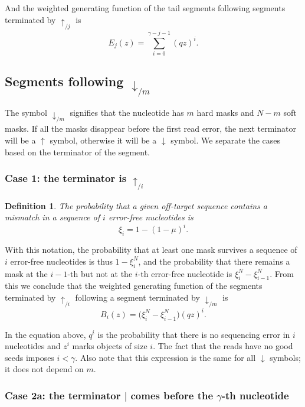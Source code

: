 \documentclass{article}
\newtheorem{definition}{Definition}
\begin{document}
And the weighted generating function of the tail segments following
segments terminated by $\uparrow_{/j}$ is
\begin{equation}
\label{eq:E}
E_j(z) = \sum_{i=0}^{\gamma-j-1} (qz)^i.
\end{equation}


\subsection{Segments following $\downarrow_{/m}$}

The symbol $\downarrow_{/m}$ signifies that the nucleotide has $m$ hard
masks and $N-m$ soft masks. If all the masks disappear before the first
read error, the next terminator will be a $\uparrow$ symbol, otherwise it
will be a $\downarrow$ symbol. We separate the cases based on the
terminator of the segment.

\subsubsection*{Case 1: the terminator is $\uparrow_{/i}$}

\begin{definition}
The probability that a given off-target sequence contains a mismatch in a
sequence of $i$ error-free nucleotides is
\begin{equation}
\label{eq:xi}
\xi_i = 1-(1-\mu)^i.
\end{equation}
\end{definition}

With this notation, the probability that at least one mask survives a
sequence of $i$ error-free nucleotides is thus $1-\xi_i^N$, and the
probability that there remains a mask at the $i-1$-th but not at the 
$i$-th error-free nucleotide is $\xi_i^N - \xi_{i-1}^N$. From this we
conclude that the weighted generating function of the segments terminated
by $\uparrow_{/i}$ following a segment terminated by $\downarrow_{/m}$ is
\begin{equation}
\label{eq:B}
B_i(z) = \Big( \xi_i^N-\xi_{i-1}^N \Big) (qz)^i.
\end{equation}

In the equation above, $q^i$ is the probability that there is no
sequencing error in $i$ nucleotides and $z^i$ marks objects of size $i$.
The fact that the reads have no good seeds imposes $i < \gamma$. Also note
that this expression is the same for all $\downarrow$ symbols; it does not
depend on $m$.

\subsubsection*{Case 2a: the terminator $|$ comes before the $\gamma$-th
nucleotide}
\end{document}
